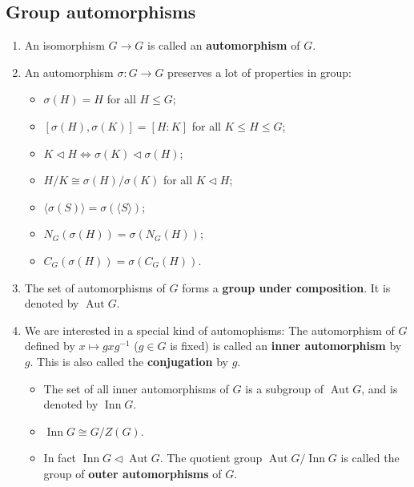 \subsection*{Group automorphisms}
\begin{enumerate}[(1)]
	\item An isomorphism $G\rightarrow G$ is called an \textbf{automorphism} of $G$.
	\item An automorphism $\sigma: G\rightarrow G$ preserves a lot of properties in group:
	\begin{itemize}
		\item $\sigma(H) = H$ for all $H\leq G$;
		\item $[\sigma(H),\sigma(K)] = [H:K]$ for all $K\leq H\leq G$;
		\item $K\lhd H\Leftrightarrow \sigma(K)\lhd \sigma(H)$;
		\item $H/K \cong \sigma(H)/\sigma(K)$ for all $K\lhd H$;
		\item $\langle \sigma(S)\rangle =\sigma(\langle S\rangle)$;
		\item $N_G(\sigma(H)) = \sigma(N_G(H))$;
		\item $C_G(\sigma(H)) = \sigma(C_G(H))$.
	\end{itemize}
	\item The set of automorphisms of $G$ forms a \textbf{group under composition}. It is denoted by $\operatorname{Aut}G$.
	\item We are interested in a special kind of automophisms: The automorphism of $G$ defined by $x\mapsto gxg^{-1}$ ($g\in G$ is fixed) is called an \textbf{inner automorphism} by $g$. This is also called the \textbf{conjugation} by $g$. 
	\begin{itemize}
		\item The set of all inner automorphisms of $G$ is a subgroup of $\operatorname{Aut}G$, and is denoted by $\operatorname{Inn} G$. 
		\item $\operatorname{Inn} G \cong G/Z(G)$.
		\item In fact $\operatorname{Inn} G\lhd \operatorname{Aut}G$. The quotient group   $\operatorname{Aut}G / \operatorname{Inn} G$ is called the group of \textbf{outer automorphisms} of $G$.
	\end{itemize}


\end{enumerate}
